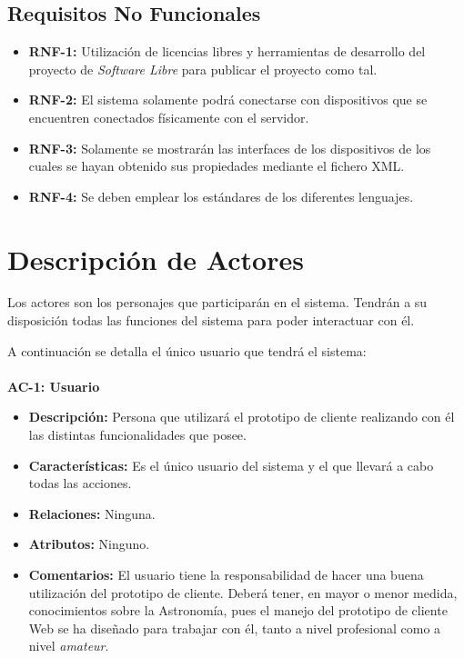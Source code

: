 \subsection{Requisitos No Funcionales}
\begin{itemize}
  \item \textbf{RNF-1:} Utilización de licencias libres y herramientas de desarrollo del proyecto de \textit{Software Libre} para publicar el proyecto como tal.
  \item \textbf{RNF-2:} El sistema solamente podrá conectarse con dispositivos que se encuentren conectados físicamente con el servidor.
  \item \textbf{RNF-3:} Solamente se mostrarán las interfaces de los dispositivos de los cuales se hayan obtenido sus propiedades mediante el fichero XML.
  \item \textbf{RNF-4:} Se deben emplear los estándares de los diferentes lenguajes.
\end{itemize}

\section{Descripción de Actores}
Los actores son los personajes que participarán en el sistema. Tendrán a su disposición todas las funciones del sistema para poder interactuar con él.

A continuación se detalla el único usuario que tendrá el sistema:\\ \\
\textbf{AC-1: Usuario}
\begin{itemize}
  \item \textbf{Descripción:} Persona que utilizará el prototipo de cliente realizando con él las distintas funcionalidades que posee.
  \item \textbf{Características:} Es el único usuario del sistema y el que llevará a cabo todas las acciones.
  \item \textbf{Relaciones:} Ninguna.
  \item \textbf{Atributos:} Ninguno.
  \item \textbf{Comentarios:} El usuario tiene la responsabilidad de hacer una buena utilización del prototipo de cliente. Deberá tener, en mayor o menor medida, conocimientos sobre la Astronomía, pues el manejo del prototipo de cliente Web se ha diseñado para trabajar con él, tanto a nivel profesional como a nivel \textit{amateur}.
\end{itemize}


